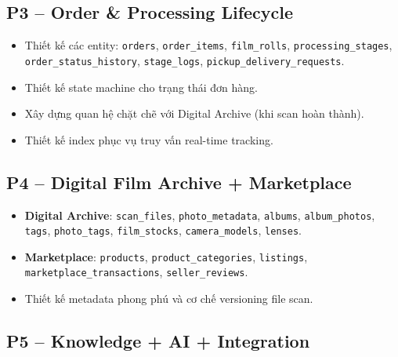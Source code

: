 \documentclass[12pt,a4paper]{article}
\begin{document}
\vspace{8pt}

\subsection{P3 -- Order \& Processing Lifecycle}

\begin{itemize}[leftmargin=*]
    \item Thiết kế các entity: \texttt{orders}, \texttt{order\_items}, \texttt{film\_rolls}, \texttt{processing\_stages}, \texttt{order\_status\_history}, \texttt{stage\_logs}, \texttt{pickup\_delivery\_requests}.
    \item Thiết kế state machine cho trạng thái đơn hàng.
    \item Xây dựng quan hệ chặt chẽ với Digital Archive (khi scan hoàn thành).
    \item Thiết kế index phục vụ truy vấn real-time tracking.
\end{itemize}

\vspace{8pt}

\subsection{P4 -- Digital Film Archive + Marketplace}

\begin{itemize}[leftmargin=*]
    \item \textbf{Digital Archive}: \texttt{scan\_files}, \texttt{photo\_metadata}, \texttt{albums}, \texttt{album\_photos}, \texttt{tags}, \texttt{photo\_tags}, \texttt{film\_stocks}, \texttt{camera\_models}, \texttt{lenses}.
    \item \textbf{Marketplace}: \texttt{products}, \texttt{product\_categories}, \texttt{listings}, \texttt{marketplace\_transactions}, \texttt{seller\_reviews}.
    \item Thiết kế metadata phong phú và cơ chế versioning file scan.
\end{itemize}

\vspace{8pt}

\subsection{P5 -- Knowledge + AI + Integration}
\end{document}
